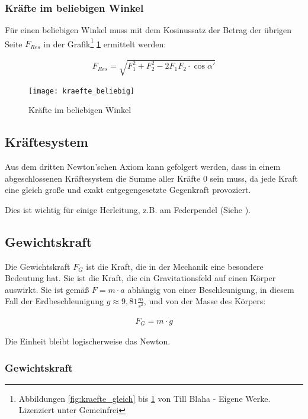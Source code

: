 \subsubsection{Kräfte im beliebigen Winkel}

\noindent Für einen beliebigen Winkel muss mit dem Kosinussatz der Betrag der übrigen Seite $F_{Res}$ in der Grafik\footnote{Abbildungen \ref{fig:kraefte_gleich} bis \ref{fig:kraefte_beliebig} von Till Blaha - Eigene Werke. Lizenziert unter Gemeinfrei} \ref{fig:kraefte_beliebig} ermittelt werden:

\begin{align}
	F_{Res} = \sqrt{F_1^2 + F_2^2 - 2F_1 F_2 \cdot \cos{\alpha '}}
\end{align}

\begin{figure}[h!]
	\centering
	\texttt{[image: kraefte\_beliebig]}
	\caption{Kräfte im beliebigen Winkel}
	\label{fig:kraefte_beliebig}
\end{figure}




\subsection{Kräftesystem}

Aus dem dritten Newton'schen Axiom kann gefolgert werden, dass in einem abgeschlossenen Kräftesystem die Summe aller Kräfte $0$ sein muss, da jede Kraft eine gleich große und exakt entgegengesetzte Gegenkraft provoziert.

Dies ist wichtig für einige Herleitung, z.B. am Federpendel (Siehe ).


\subsection{Gewichtskraft} \label{subsec:Gewichtskraft}

Die Gewichtskraft $F_{G}$ ist die Kraft, die in der Mechanik eine besondere Bedeutung hat. Sie ist die Kraft, die ein Gravitationsfeld auf einen Körper auswirkt. Sie ist gemäß $F = m \cdot a$ abhängig von einer Beschleunigung, in diesem Fall der Erdbeschleunigung $g \approx 9,81 \frac{m}{s^2}$, und von der Masse des Körpers:

\begin{align}
	F_{G} = m \cdot g
\end{align}

\noindent Die Einheit bleibt logischerweise das Newton.

\subsubsection{Gewichtskraft}
